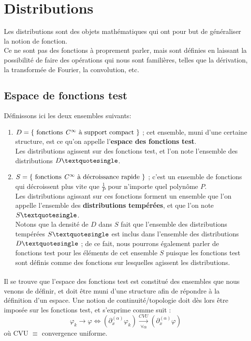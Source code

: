 \documentclass[../notesdecours.tex]{subfiles}
\begin{document}
\section{Distributions}
Les distributions sont des objets mathématiques qui ont pour but de généraliser la notion de fonction. \\
Ce ne sont pas des fonctions à proprement parler, mais sont définies en laissant la possibilité de faire des opérations
qui nous sont familières, telles que la dérivation, la transformée de Fourier, la convolution, etc.\\

\subsection{Espace de fonctions test}

Définissons ici les deux ensembles suivants: 
\begin{enumerate}
    \item $D = \left\{ \mbox{ fonctions \textit{C}$^{\infty}$ à support compact } \right\}$ ; cet ensemble, muni d'une certaine structure, est ce qu'on appelle l'\textbf{espace des fonctions test}.\\ 
    Les distributions agissent sur des fonctions test, et l'on note l'ensemble des distributions $D \textquotesingle$. \\
    \item $S = \left\{ \mbox{ fonctions \textit{C}$^{\infty}$ à décroissance rapide } \right\}$ ; c'est un ensemble de fonctions qui décroissent plus vite que $\frac{1}{P}$ pour n'importe quel polynôme $P$. \\
    Les distributions agissant sur ces fonctions forment un ensemble que l'on appelle l'ensemble des \textbf{distributions tempérées}, et que l'on note $S \textquotesingle$. \\
    Notons que la densité de $D$ dans $S$ fait que l'ensemble des distributions tempérées $S \textquotesingle$ est inclus dans l'ensemble des distributions $D \textquotesingle$ ;
    de ce fait, nous pourrons également parler de fonctions test pour les éléments de cet ensemble $S$ puisque les fonctions test sont définis comme des fonctions sur lesquelles agissent les distributions. 
\end{enumerate}

\paragraph{} Il se trouve que l'espace des fonctions test est constitué des ensembles que nous venons de définir, 
et doit être muni d'une structure afin de répondre à la définition d'un espace. 
Une notion de continuité/topologie doit dès lors être imposée sur les fonctions test, et s'exprime comme suit :
\begin{equation}
\varphi_k \rightarrow \varphi \iff (\partial_x^{(\alpha)} \varphi_k) \xrightarrow[\forall \alpha]{CVU} (\partial_x^{(\alpha)}\varphi)
\end{equation}
où CVU $\equiv$ convergence uniforme.
\end{document}
